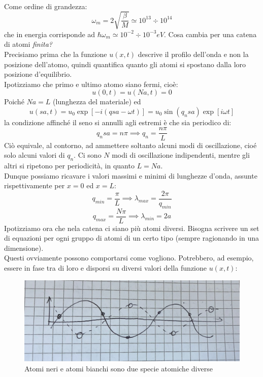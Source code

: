 \documentclass{book}
\begin{document}
        \paragraph{}
            Come ordine di grandezza:
            $$\omega_{m} = 2 \sqrt{\frac{\beta}{M}} \simeq 10^{13} \div 10^{14}$$
            che in energia corrisponde ad $\hbar \omega_{m} \simeq 10^{-2} \div 10^{-3} eV$.
            Cosa cambia per una catena di atomi \textit{finita?}\\
            Precisiamo prima che la funzione $u(x,t)$ descrive il profilo dell'onda e non la posizione dell'atomo, quindi quantifica quanto gli atomi si spostano dalla loro posizione d'equilibrio.\\
            Ipotizziamo che primo e ultimo atomo siano fermi, cioè:
            $$u(0,t) = u(Na,t) = 0$$
            Poiché $Na = L$ (lunghezza del materiale) ed
            $$u(sa,t) = u_{0}\exp{[-i(qsa-\omega t)]} = u_{0}\sin{(q_{n}sa)}\exp{[i\omega t]}$$
            la condizione affinché il seno si annulli agli estremi è che sia periodico di: 
            $$q_{n}sa = n \pi \implies q_{n} = \frac{n \pi}{L}$$
            Ciò equivale, al contorno, ad ammettere soltanto alcuni modi di oscillazione, cioé solo alcuni valori di $q_{n}$. Ci sono $N$ modi di oscillazione indipendenti, mentre gli altri si ripetono per periodicità, in quanto $L=Na$.\\
            Dunque possiamo ricavare i valori massimi e minimi di lunghezze d'onda, assunte rispettivamente per $x=0$ ed $x=L$:
            $$q_{min} = \frac{\pi}{L} \implies\lambda_{max} = \frac{2\pi}{q_{min}}$$
            $$q_{max} = \frac{N \pi}{L} \implies \lambda_{min} = 2a$$
            Ipotizziamo  ora che nela catena ci siano più atomi diversi. Bisogna scrivere un set di equazioni per ogni gruppo di atomi di un certo tipo (sempre ragionando in una dimensione).\\
            Questi ovviamente possono comportarsi come vogliono. Potrebbero, ad esempio, essere in fase tra di loro e disporsi su diversi valori della funzione $u(x,t)$:
            \begin{figure}[h!]
                \centering
                \includegraphics[width=0.5\linewidth]{img/imnothere5.png}
                \caption{Atomi neri e atomi bianchi sono due specie atomiche diverse}
            \end{figure}
\end{document}
